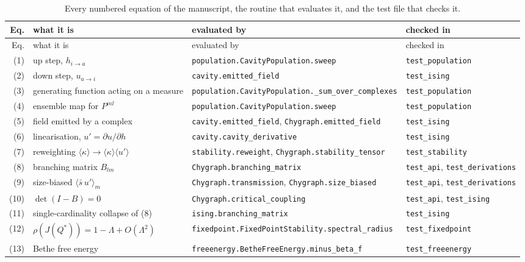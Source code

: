 \documentclass[aps,pre,onecolumn,superscriptaddress,floatfix,nofootinbib]{revtex4-2}
\newcommand{\ave}[1]{\langle #1 \rangle}
\newcommand{\code}[1]{\texttt{#1}}
\newcommand{\sbar}{\bar s}
\begin{document}
{\footnotesize
\begin{longtable}{@{}r L{0.29\textwidth} L{0.37\textwidth} L{0.17\textwidth}@{}}
\caption{\label{tab:map}Every numbered equation of the manuscript, the routine
that evaluates it, and the test file that checks it.}\\
\hline\hline
Eq. & what it is & evaluated by & checked in \\
\hline
\endfirsthead
\hline\hline
Eq. & what it is & evaluated by & checked in \\
\hline
\endhead
\hline\hline
\endfoot
(1)  & up step, $h_{i\to a}$ & \code{population.CavityPopulation.sweep} & \code{test\_population} \\
(2)  & down step, $u_{a\to i}$ & \code{cavity.emitted\_field} & \code{test\_ising} \\
(3)  & generating function acting on a measure & \code{population.CavityPopulation.}\newline\code{\_sum\_over\_complexes} & \code{test\_population} \\
(4)  & ensemble map for $P^{ml}$ & \code{population.CavityPopulation.sweep} & \code{test\_population} \\
(5)  & field emitted by a complex & \code{cavity.emitted\_field}, \code{Chygraph.emitted\_field} & \code{test\_ising} \\
(6)  & linearisation, $u'=\partial u/\partial h$ & \code{cavity.cavity\_derivative} & \code{test\_ising} \\
(7)  & reweighting $\ave{\kappa}\to\ave{\kappa}\ave{u'}$ & \code{stability.reweight}, \code{Chygraph.stability\_tensor} & \code{test\_stability} \\
(8)  & branching matrix $B_{lm}$ & \code{Chygraph.branching\_matrix} & \code{test\_api}, \code{test\_derivations} \\
(9)  & size-biased $\ave{\sbar\,u'}_m$ & \code{Chygraph.transmission}, \code{Chygraph.size\_biased} & \code{test\_api}, \code{test\_derivations} \\
(10) & $\det(I-B)=0$ & \code{Chygraph.critical\_coupling} & \code{test\_api}, \code{test\_ising} \\
(11) & single-cardinality collapse of (8) & \code{ising.branching\_matrix} & \code{test\_ising} \\
(12) & $\rho(J(Q^\ast))=1-\Lambda+O(\Lambda^2)$ & \code{fixedpoint.FixedPointStability.}\newline\code{spectral\_radius} & \code{test\_fixedpoint} \\
(13) & Bethe free energy & \code{freeenergy.BetheFreeEnergy.minus\_beta\_f} & \code{test\_freeenergy} \\

\end{longtable}}
\end{document}
